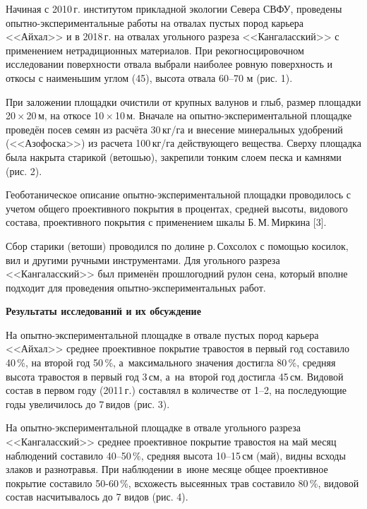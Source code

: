 Начиная с 2010\,г. институтом прикладной экологии Севера СВФУ, проведены опытно-экспериментальные работы на отвалах пустых пород карьера <<Айхал>> и в 2018\,г. на отвалах угольного разреза <<Кангаласский>> с применением нетрадиционных материалов. При рекогносцировочном исследовании поверхности отвала выбрали наиболее ровную поверхность и откосы с наименьшим углом (45\dg), высота отвала 60--70 м (рис. 1).

При заложении площадки очистили от крупных валунов и глыб, размер площадки 20\,$\times$\,20\,м, на откосе 10\,$\times$\,10\,м. Вначале на опытно-экс\-пе\-ри\-мен\-таль\-ной площадке проведён посев семян из расчёта 30\,кг/га и внесение минеральных удобрений (<<Азофоска>>) из расчета 100\,кг/га действующего вещества. Сверху площадка была накрыта старикой (ветошью), закрепили тонким слоем песка и камнями (рис. 2).

Геоботаническое описание опытно-экспериментальной площадки проводилось с учетом общего проективного покрытия в процентах, средней высоты, видового состава, проективного покрытия с применением шкалы Б.\,М.\,Миркина [3].

Сбор старики (ветоши) проводился по долине р.\,Сохсолох с помощью косилок, вил и другими ручными инструментами. Для угольного разреза <<Кангаласский>> был применён прошлогодний рулон сена, который вполне подходит для проведения опытно-экспериментальных работ.

\textbf{Результаты исследований и их обсуждение}

На опытно-экспериментальной площадке в отвале пустых пород карьера <<Айхал>> среднее проективное покрытие травостоя в первый год составило 40\,\%, на второй год 50\,\%, а~максимального значения достигла 80\,\%, средняя высота травостоя в первый год 3\,см, а~на~второй год достигла 45\,см. Видовой состав в первом году (2011\,г.) составлял в количестве от 1--2, на последующие годы увеличилось до 7\,видов (рис. 3).





На опытно-экспериментальной площадке в отвале угольного разреза <<Кангаласский>> среднее проективное покрытие травостоя на май месяц наблюдений составило 40--50\,\%, средняя высота 10--15\,см (май), видны всходы злаков и разнотравья. При наблюдении в~июне месяце общее проективное покрытие составило 50-60\,\%, всхожесть высеянных трав составило 80\,\%, видовой состав насчитывалось до 7 видов (рис. 4).

